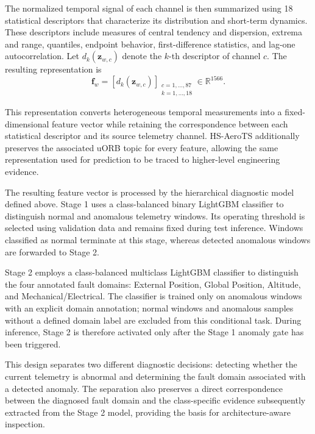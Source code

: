 The normalized temporal signal of each channel is then summarized using 18 statistical descriptors that characterize its distribution and short-term dynamics. These descriptors include measures of central tendency and dispersion, extrema and range, quantiles, endpoint behavior, first-difference statistics, and lag-one autocorrelation. Let $d_k(\mathbf{z}_{w,c})$ denote the $k$-th descriptor of channel $c$. The resulting representation is
\begin{equation}
\mathbf{f}_{w}
=
\left[
d_k(\mathbf{z}_{w,c})
\right]_{
\substack{c=1,\ldots,87\\k=1,\ldots,18}}
\in
\mathbb{R}^{1566}.
\label{eq:window_feature_vector}
\end{equation}

This representation converts heterogeneous temporal measurements into a fixed-dimensional feature vector while retaining the correspondence between each statistical descriptor and its source telemetry channel. HS-AeroTS additionally preserves the associated uORB topic for every feature, allowing the same representation used for prediction to be traced to higher-level engineering evidence.

The resulting feature vector is processed by the hierarchical diagnostic model defined above. Stage 1 uses a class-balanced binary LightGBM classifier to distinguish normal and anomalous telemetry windows. Its operating threshold is selected using validation data and remains fixed during test inference. Windows classified as normal terminate at this stage, whereas detected anomalous windows are forwarded to Stage 2.

Stage 2 employs a class-balanced multiclass LightGBM classifier to distinguish the four annotated fault domains: External Position, Global Position, Altitude, and Mechanical/Electrical. The classifier is trained only on anomalous windows with an explicit domain annotation; normal windows and anomalous samples without a defined domain label are excluded from this conditional task. During inference, Stage 2 is therefore activated only after the Stage 1 anomaly gate has been triggered.

This design separates two different diagnostic decisions: detecting whether the current telemetry is abnormal and determining the fault domain associated with a detected anomaly. The separation also preserves a direct correspondence between the diagnosed fault domain and the class-specific evidence subsequently extracted from the Stage 2 model, providing the basis for architecture-aware inspection.

